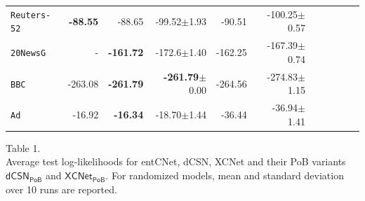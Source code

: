 \documentclass[xcolor={usenames,dvipsnames,svgnames}, compress]{beamer}
\begin{document}
\begin{frame}[t]
\begin{table}[t]
\begin{tabular}{l rrrrrrrrrr}
    \texttt{Reuters-52}   &\textbf{-88.55}&-88.65&-99.52$\pm$1.93&-90.51&-100.25$\pm$0.57\\
    \texttt{20NewsG} & - &\textbf{-161.72}&-172.6$\pm$1.40&-162.25&-167.39$\pm$0.74\\
    \texttt{BBC}          &-263.08&\textbf{-261.79}&\textbf{-261.79}$\pm$0.00&-264.56&-274.83$\pm$1.15\\
    \texttt{Ad}           &-16.92&\textbf{-16.34}&-18.70$\pm$1.44&-36.44&-36.94$\pm$1.41\\
    \bottomrule
  \end{tabular}
  \label{tab:ll-sing}
\end{table}\vspace{-10pt}\hspace{35pt}
\begin{minipage}{0.8\linewidth}
  \tiny
  \flushleft
  Table 1.\\
  Average test log-likelihoods for 
  \textsf{entCNet}, \textsf{dCSN}, \textsf{XCNet} and their
  \textsf{PoB} variants $\mathsf{dCSN_{PoB}}$ and $\mathsf{XCNet_{PoB}}$.
    For randomized models, mean and standard deviation over 10 runs are reported.
\end{minipage}
\end{frame}
\end{document}
